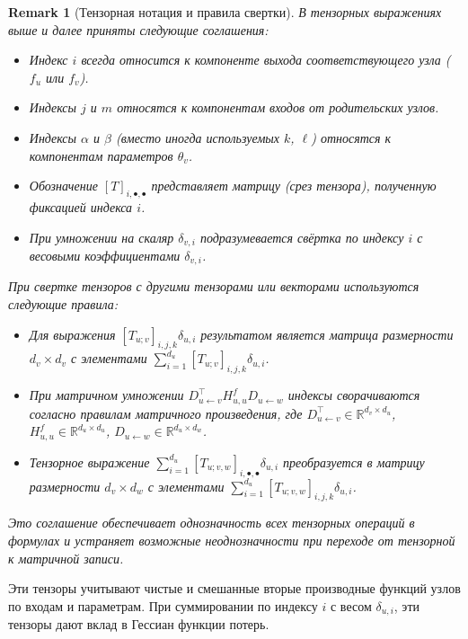 \documentclass[11pt]{article}
\newtheorem{remark}{Remark}
\begin{document}
\begin{remark}[Тензорная нотация и правила свертки]
  В тензорных выражениях выше и далее приняты следующие соглашения:
  \begin{itemize}
    \item Индекс $i$ всегда относится к компоненте выхода соответствующего узла ($f_u$ или $f_v$).
    \item Индексы $j$ и $m$ относятся к компонентам входов от родительских узлов.
    \item Индексы $\alpha$ и $\beta$ (вместо иногда используемых $k$, $\ell$) относятся к компонентам
      параметров $\theta_v$.
    \item Обозначение $[T]_{i,\bullet,\bullet}$ представляет матрицу (срез тензора), полученную фиксацией индекса $i$.
    \item При умножении на скаляр $\delta_{v,i}$ подразумевается свёртка по индексу $i$ с весовыми
      коэффициентами $\delta_{v,i}$.
  \end{itemize}

  При свертке тензоров с другими тензорами или векторами используются следующие правила:
  \begin{itemize}
    \item Для выражения $[T_{u;v}]_{i,j,k}\delta_{u,i}$ результатом является матрица размерности $d_v \times
      d_v$ с элементами $\sum_{i=1}^{d_u}[T_{u;v}]_{i,j,k}\delta_{u,i}$.
    \item При матричном умножении $D_{u\gets v}^\top H^f_{u,u} D_{u\gets w}$ индексы сворачиваются согласно
      правилам матричного произведения, где $D_{u\gets v}^\top \in \mathbb{R}^{d_v \times d_u}$, $H^f_{u,u}
      \in \mathbb{R}^{d_u \times d_u}$, $D_{u\gets w} \in \mathbb{R}^{d_u \times d_w}$.
    \item Тензорное выражение $\sum_{i=1}^{d_u}[T_{u;v,w}]_{i,\bullet,\bullet}\delta_{u,i}$ преобразуется в
      матрицу размерности $d_v \times d_w$ с элементами $\sum_{i=1}^{d_u}[T_{u;v,w}]_{i,j,k}\delta_{u,i}$.
  \end{itemize}

  Это соглашение обеспечивает однозначность всех тензорных операций в формулах и устраняет возможные
  неоднозначности при переходе от тензорной к матричной записи.
\end{remark}

Эти тензоры учитывают чистые и смешанные вторые производные функций узлов по входам и параметрам. При
суммировании по индексу $i$ с весом $\delta_{u,i}$, эти тензоры дают вклад в Гессиан функции потерь.
\end{document}
